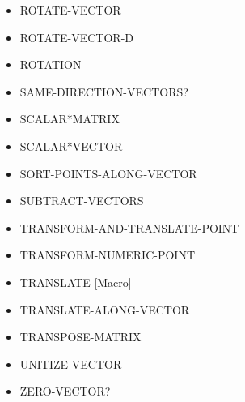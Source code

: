 \documentclass [11pt]{book}
\begin{document}
\begin{itemize}
\item {}ROTATE-VECTOR





\item {}ROTATE-VECTOR-D





\item {}ROTATION





\item {}SAME-DIRECTION-VECTORS?





\item {}SCALAR*MATRIX





\item {}SCALAR*VECTOR





\item {}SORT-POINTS-ALONG-VECTOR





\item {}SUBTRACT-VECTORS





\item {}TRANSFORM-AND-TRANSLATE-POINT





\item {}TRANSFORM-NUMERIC-POINT





\item {}TRANSLATE [Macro]





\item {}TRANSLATE-ALONG-VECTOR





\item {}TRANSPOSE-MATRIX





\item {}UNITIZE-VECTOR





\item {}ZERO-VECTOR?





\end{itemize}
\end{document}
